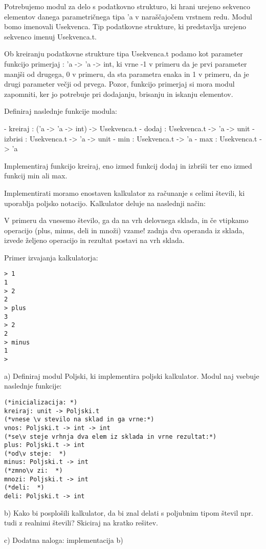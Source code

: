 \begin{ex}
Potrebujemo modul za delo s podatkovno strukturo, ki hrani urejeno sekvenco elementov danega parametri\v cnega tipa 'a v nara\v s\v cajo\v cem vrstnem redu. Modul bomo imenovali Usekvenca. Tip podatkovne strukture, ki predstavlja urejeno sekvenco imenuj Usekvenca.t.

Ob kreiranju podatkovne strukture tipa Usekvenca.t podamo kot parameter funkcijo primerjaj : 'a -> 'a -> int, ki vrne -1 v primeru da je prvi parameter manj\v si od drugega, 0 v primeru, da sta parametra enaka in 1 v primeru, da je drugi parameter ve\v cji od prvega. Pozor, funkcijo primerjaj si mora modul zapomniti, ker jo potrebuje pri
dodajanju, brisanju in iskanju elementov.

Definiraj naslednje funkcije modula: 

- kreiraj : ('a -> 'a -> int) -> Usekvenca.t 
- dodaj : Usekvenca.t -> 'a -> unit 
- izbrisi : Usekvenca.t -> 'a -> unit   
- min : Usekvenca.t -> 'a 
- max : Usekvenca.t -> 'a 

Implementiraj funkcijo kreiraj, eno izmed funkcij dodaj in izbri\v si ter
eno izmed funkcij min ali max.



\end{ex}
\begin{ex}
Implementirati moramo enostaven kalkulator za ra\v cunanje s celimi
\v stevili, ki uporablja poljsko notacijo. Kalkulator deluje na naslednji
na\v cin:

V primeru da vnesemo \v stevilo, ga da na vrh delovnega sklada, in \v ce
vtipkamo operacijo (plus, minus, deli in mno\v zi) vzame! zadnja dva
operanda iz sklada, izvede \v zeljeno operacijo in rezultat postavi na
vrh sklada.

Primer izvajanja kalkulatorja: 
\begin{verbatim}
> 1 
1 
> 2 
2 
> plus 
3 
> 2 
2 
> minus 
1 
> 
\end{verbatim}

a) Definiraj modul Poljski, ki implementira poljski kalkulator. Modul
naj vsebuje naslednje funkcije:

\begin{verbatim}
(*inicializacija: *)
kreiraj: unit -> Poljski.t      
(*vnese \v stevilo na sklad in ga vrne:*)
vnos: Poljski.t -> int -> int   
(*se\v steje vrhnja dva elem iz sklada in vrne rezultat:*)
plus: Poljski.t -> int    
(*od\v steje:  *)
minus: Poljski.t -> int         
(*zmno\v zi:  *)
mnozi: Poljski.t -> int         
(*deli:  *)
deli: Poljski.t -> int          
\end{verbatim}

b) Kako bi posplo\v sili kalkulator, da bi znal delati s poljubnim tipom \v stevil npr. tudi z realnimi \v stevili? Skiciraj na kratko re\v sitev. 

c) Dodatna naloga: implementacija b)  

\end{ex}

